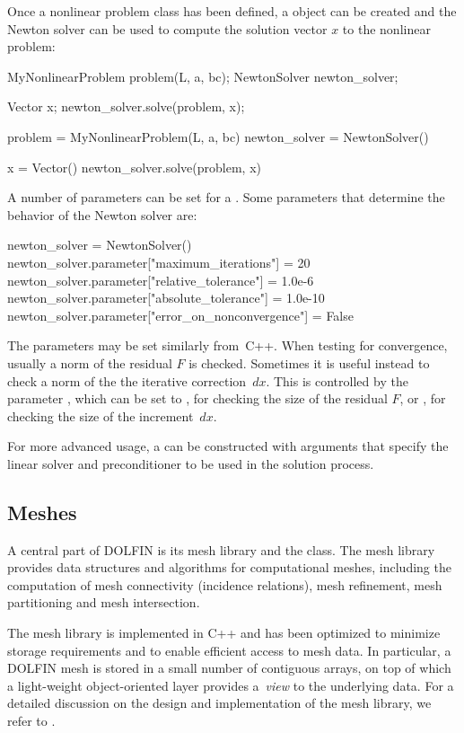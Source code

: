 Once a nonlinear problem class has been defined, a 
object can be created and the Newton solver can be used to compute
the solution vector $x$ to the nonlinear problem:
\begin{c++}
MyNonlinearProblem problem(L, a, bc);
NewtonSolver newton_solver;

Vector x;
newton_solver.solve(problem, x);
\end{c++}
\begin{python}
problem = MyNonlinearProblem(L, a, bc)
newton_solver = NewtonSolver()

x = Vector()
newton_solver.solve(problem, x)
\end{python}
A number of parameters can be set for a . Some
parameters that determine the behavior of the Newton solver are:
\begin{python}
newton_solver = NewtonSolver()
newton_solver.parameter["maximum_iterations"] = 20
newton_solver.parameter["relative_tolerance"] = 1.0e-6
newton_solver.parameter["absolute_tolerance"] = 1.0e-10
newton_solver.parameter["error_on_nonconvergence"] = False
\end{python}
The parameters may be set similarly from~C++.  When testing for
convergence, usually a norm of the residual $F$ is checked.  Sometimes it
is useful instead to check a norm of the the iterative correction~$dx$.
This is controlled by the parameter , which
can be set to , for checking the size of the residual $F$,
or , for checking the size of the increment~$dx$.

For more advanced usage, a  can be constructed with
arguments that specify the linear solver and preconditioner to be used
in the solution process.

\subsection{Meshes}

A central part of DOLFIN is its mesh library and the 
class. The mesh library provides data structures and algorithms for
computational meshes, including the computation of mesh connectivity
(incidence relations), mesh refinement, mesh partitioning and mesh
intersection.

The mesh library is implemented in C++ and has been optimized to
minimize storage requirements and to enable efficient access to mesh
data. In particular, a DOLFIN mesh is stored in a small number of
contiguous arrays, on top of which a light-weight object-oriented
layer provides a~\emph{view} to the underlying data. For a detailed
discussion on the design and implementation of the mesh library, we
refer to \citet{Logg2009}.

